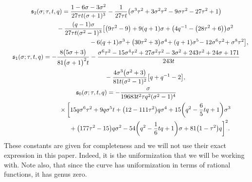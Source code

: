 \documentclass[10pt,a4paper]{amsart}
\numberwithin{equation}{section}
\begin{document}
 \begin{gather*}
 \mathfrak{s}_2(\sigma;\tau,t,q)= \frac{1-6\sigma-3\sigma^2}{27\tau t (\sigma+1)^3} - \frac{1}{27\tau t}\bigl(\sigma^{3} \tau^{2}+3 \sigma^{2} \tau^{2}-9 \sigma \tau^{2}-27 \tau^{2}+1\bigr) \nonumber\\
 \hphantom{\mathfrak{s}_2(\sigma;\tau,t,q)=}{}
 -\frac{(q-1)\sigma}{27\tau t(\sigma^2 - 1)^3}\bigl[\bigl(9 \tau^{2}-9\bigr)+9(q+1) \sigma +\bigl(4q^{-1}-\bigl(28 \tau^{2}+6\bigr) \bigr) \sigma^{2} \\
 \hphantom{\mathfrak{s}_2(\sigma;\tau,t,q)=-\frac{(q-1)\sigma}{27\tau t(\sigma^2 - 1)^3}\bigl[}{}
 -6 (q+1 ) \sigma^{3}\!+\bigl(30 \tau^{2}+3\bigr)\sigma^{4}\!+(q+1) \sigma^{5}\!-12\sigma^{6} \tau^{2}\!+\sigma^{8} \tau^{2}\bigr]\nonumber,\\
 \mathfrak{s}_1(\sigma;\tau,t,q) = -\frac{8 \bigl(5 \sigma +3\bigr)}{81 \bigl(\sigma +1\bigr)^{2} t} -\frac{\sigma^{6} \tau^{2}-15 \sigma^{4} \tau^{2}+27 \sigma^{2} \tau^{2}-3 \sigma^{2}+243 \tau^{2}+24 \sigma +171}{243 t}\nonumber\\
 \hphantom{\mathfrak{s}_1(\sigma;\tau,t,q) =}{}
 -\frac{4\sigma^3\bigl(\sigma^2+3\bigr)}{81t(\sigma^2 - 1)^2}\bigl[q+q^{-1}-2\bigr],\\
 \mathfrak{s}_0(\sigma;\tau,t,q) = -\frac{\sigma}{19683t^2\tau q^2(\sigma^2 - 1)^4} \nonumber \\
 \hphantom{\mathfrak{s}_0(\sigma;\tau,t,q) =}{}
 \times\biggl[15 q \sigma^{6} \tau^{2}+9 q \sigma^{5} t +\bigl(12-111 \tau^{2}\bigr) q\sigma^{4} +15\biggl(q^{2}-\frac{6}{5}t q +1\biggr) \sigma^{3}\nonumber\\
 \hphantom{\mathfrak{s}_0(\sigma;\tau,t,q) =\times\bigl[}{}
 +\bigl(177 \tau^{2}-15\bigr) q \sigma^{2}-54\biggl(q^{2}-\frac{1}{6}t q +1\biggr) \sigma
 + 81\bigl(1-\tau^{2}\bigr) q\biggr]^2.
 \end{gather*}
 These constants are given for completeness and we will not use their exact expression in this paper. Indeed, it is the uniformization that we will be working with. Note also, that since the curve has uniformization in terms of rational functions, it has genus zero.
\end{document}
